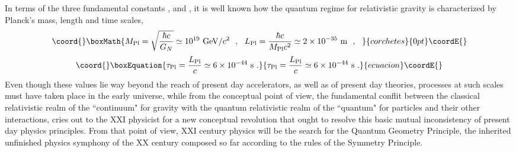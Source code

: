 \documentclass[a4paper,11pt]{article}
\begin{document}
In terms of the three fundamental constants \coordHE{}, \coordHE{} and \myHighlight{$\hbar$}\coordHE{}, it is well
known how the quantum regime for relativistic gravity is characterized
by Planck's mass, length and time scales,
\begin{displaymath}\coord{}\boxMath{
M_{\rm Pl}=\sqrt{\frac{\hbar c}{G_N}}\simeq 10^{19}\ {\rm GeV}/c^2\ \ ,\ \ 
L_{\rm Pl}=\frac{\hbar c}{M_{\rm Pl}c^2}\simeq 2\times 10^{-35}\ {\rm m}
\ \ ,\ \ 
}{corchetes}{0pt}\coordE{}\end{displaymath}
\begin{equation}\coord{}\boxEquation{
\tau_{\rm Pl}=\frac{L_{\rm Pl}}{c}\simeq 6\times 10^{-44}\ {\rm s}\ .
}{
\tau_{\rm Pl}=\frac{L_{\rm Pl}}{c}\simeq 6\times 10^{-44}\ {\rm s}\ .
}{ecuacion}\coordE{}\end{equation}
Even though these values lie way beyond the reach of present day
accelerators, as well as of present day theories, processes at such scales 
must have taken place in the early universe, while from the conceptual point 
of view, the fundamental conflit between the classical relativistic realm of
the ``continuum" for gravity with the quantum relativistic realm
of the ``quantum" for particles and their other interactions, cries out
to the XXI\coordHE{} physicist for a new conceptual revolution
that ought to resolve this basic mutual inconsistency of present day
physics principles. From that point of view, XXI\myHighlight{$^{\rm st}$}\coordHE{} century
physics will be the search for the Quantum Geometry Principle,
the inherited unfinished physics symphony of the XX\myHighlight{$^{\rm th}$}\coordHE{} century
composed so far according to the rules of the Symmetry Principle.
\end{document}

